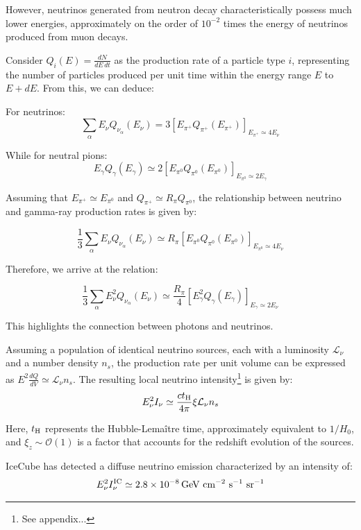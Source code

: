 However, neutrinos generated from neutron decay characteristically possess much lower energies, approximately on the order of \(10^{-2}\) times the energy of neutrinos produced from muon decays.

Consider \( Q_i(E) = \frac{dN}{dE \, dt} \) as the production rate of a particle type \( i \), representing the number of particles produced per unit time within the energy range \( E \) to \( E + dE \). From this, we can deduce:

For neutrinos:
\[
\sum_\alpha E_\nu Q_{\nu_\alpha}(E_\nu) = 3 \left[ E_{\pi^+} Q_{\pi^+} (E_{\pi^+}) \right]_{E_{\pi^+} \simeq 4 E_\nu}
\]

While for neutral pions:
\[
E_\gamma Q_\gamma(E_\gamma) \simeq 2 \left[ E_{\pi^0} Q_{\pi^0}(E_{\pi^0}) \right]_{E_{\pi^0} \simeq 2 E_\gamma}
\]

Assuming that \( E_{\pi^+} \simeq E_{\pi^0} \) and \( Q_{\pi^+} \simeq R_\pi Q_{\pi^0} \), the relationship between neutrino and gamma-ray production rates is given by:

\[
\frac{1}{3} \sum_\alpha E_\nu Q_{\nu_\alpha}(E_\nu) \simeq R_\pi \left[ E_{\pi^0} Q_{\pi^0} (E_{\pi^0}) \right]_{E_{\pi^0} \simeq 4 E_\nu}
\]

Therefore, we arrive at the relation:
%
\begin{remark}
\[
\frac{1}{3} \sum_\alpha E_\nu^2 Q_{\nu_\alpha}(E_\nu) \simeq \frac{R_\pi}{4} \left[ E^2_\gamma Q_{\gamma} (E_\gamma) \right]_{E_\gamma \simeq 2 E_\nu}
\] 
\end{remark}

This highlights the connection between photons and neutrinos.

Assuming a population of identical neutrino sources, each with a luminosity \(\mathcal L_\nu\) and a number density \(n_s\), the production rate per unit volume can be expressed as \(E^2\frac{dQ}{dV} \simeq \mathcal L_\nu n_s\). The resulting local neutrino intensity\footnote{See appendix...} is given by:
%
\[ E^2_\nu I_\nu \simeq \frac{c t_{\rm H}}{4\pi} \xi \mathcal L_\nu n_s \]

Here, \(t_{\rm H}\) represents the Hubble-Lemaître time, approximately equivalent to \(1/H_0\), and \(\xi_z \sim \mathcal O(1)\) is a factor that accounts for the redshift evolution of the sources.

IceCube has detected a diffuse neutrino emission characterized by an intensity of:
\[ E_\nu^2 I^{\rm IC}_\nu \simeq 2.8 \times 10^{-8} \, \text{GeV}~\text{cm}^{-2}~\text{s}^{-1}~\text{sr}^{-1} \]

